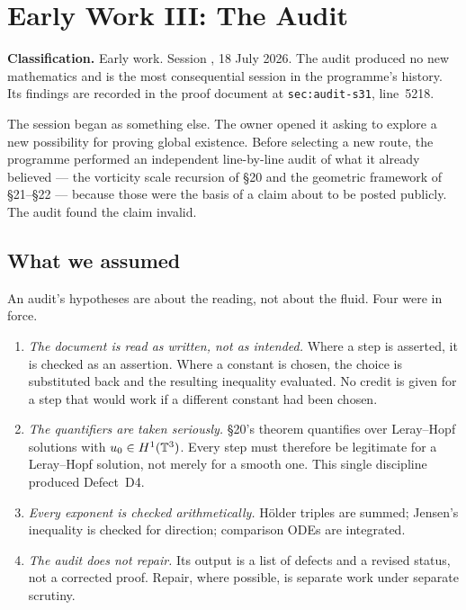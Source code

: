 \chapter{Early Work III: The Audit}
\label{ch:audit}

\begin{record}
\textbf{Classification.} Early work. Session , 18 July 2026. The audit
produced no new mathematics and is the most consequential session in the
programme's history. Its findings are recorded in the proof document at
\texttt{sec:audit-s31}, line~5218.
\end{record}

The session began as something else. The owner opened it asking to explore a
new possibility for proving global existence. Before selecting a new route,
the programme performed an independent line-by-line audit of what it already
believed --- the vorticity scale recursion of \S20 and the geometric
framework of \S21--\S22 --- because those were the basis of a claim about to
be posted publicly. The audit found the claim invalid.

\section{What we assumed}
\label{sec:audit-assumed}

An audit's hypotheses are about the reading, not about the fluid. Four were in
force.

\begin{enumerate}[leftmargin=2.2em]
\item \emph{The document is read as written, not as intended.} Where a step is
  asserted, it is checked as an assertion. Where a constant is chosen, the
  choice is substituted back and the resulting inequality evaluated. No credit
  is given for a step that would work if a different constant had been chosen.
\item \emph{The quantifiers are taken seriously.} \S20's theorem quantifies
  over Leray--Hopf solutions with \(u_0\in H^1(\mathbb{T}^3)\). Every step must
  therefore be legitimate for a Leray--Hopf solution, not merely for a smooth
  one. This single discipline produced Defect~D4.
\item \emph{Every exponent is checked arithmetically.} H\"older triples are
  summed; Jensen's inequality is checked for direction; comparison ODEs are
  integrated.
\item \emph{The audit does not repair.} Its output is a list of defects and a
  revised status, not a corrected proof. Repair, where possible, is separate
  work under separate scrutiny.
\end{enumerate}

